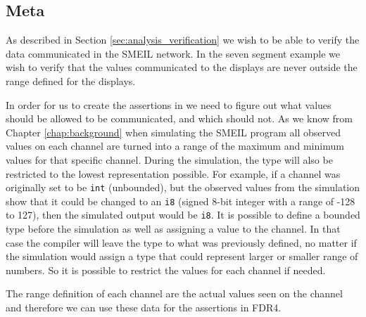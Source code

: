 \subsection{Meta}
As described in Section \ref{sec:analysis_verification} we wish to be able to verify the data communicated in the SMEIL network. In the seven segment example we wish to verify that the values communicated to the displays are never outside the range defined for the displays.

In order for us to create the assertions in \cspm{} we need to figure out what values should be allowed to be communicated, and which should not.
As we know from Chapter \ref{chap:background} when simulating the SMEIL program all observed values on each channel are turned into a range of the maximum and minimum values for that specific channel. During the simulation, the type will also be restricted to the lowest representation possible. For example, if a channel was originally set to be \texttt{int} (unbounded), but the observed values from the simulation show that it could be changed to an \texttt{i8} (signed 8-bit integer with a range of -128 to 127), then the simulated output would be \texttt{i8}.
It is possible to define a bounded type before the simulation as well as assigning a value to the channel. In that case the compiler will leave the type to what was previously defined, no matter if the simulation would assign a type that could represent larger or smaller range of numbers. So it is possible to restrict the values for each channel if needed.

The range definition of each channel are the actual values seen on the channel and therefore we can use these data for the assertions in FDR4.

